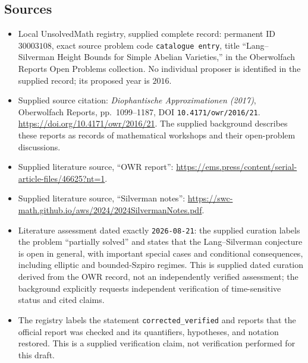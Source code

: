 \documentclass[11pt]{article}
\begin{document}
\subsection{Sources}
\begin{itemize}
\item Local UnsolvedMath registry, supplied complete record: permanent ID $30003108$, exact source problem code \texttt{catalogue entry}, title ``Lang--Silverman Height Bounds for Simple Abelian Varieties,'' in the Oberwolfach Reports Open Problems collection. No individual proposer is identified in the supplied record; its proposed year is $2016$.
\item Supplied source citation: \emph{Diophantische Approximationen (2017)}, Oberwolfach Reports, pp.\ 1099--1187, DOI \texttt{10.4171/owr/2016/21}. \url{https://doi.org/10.4171/owr/2016/21}. The supplied background describes these reports as records of mathematical workshops and their open-problem discussions.
\item Supplied literature source, ``OWR report'': \url{https://ems.press/content/serial-article-files/46625?nt=1}.
\item Supplied literature source, ``Silverman notes'': \url{https://swc-math.github.io/aws/2024/2024SilvermanNotes.pdf}.
\item Literature assessment dated exactly \texttt{2026-08-21}: the supplied curation labels the problem ``partially solved'' and states that the Lang--Silverman conjecture is open in general, with important special cases and conditional consequences, including elliptic and bounded-Szpiro regimes. This is supplied dated curation derived from the OWR record, not an independently verified assessment; the background explicitly requests independent verification of time-sensitive status and cited claims.
\item The registry labels the statement \texttt{corrected\_verified} and reports that the official report was checked and its quantifiers, hypotheses, and notation restored. This is a supplied verification claim, not verification performed for this draft.
\end{itemize}
\end{document}
